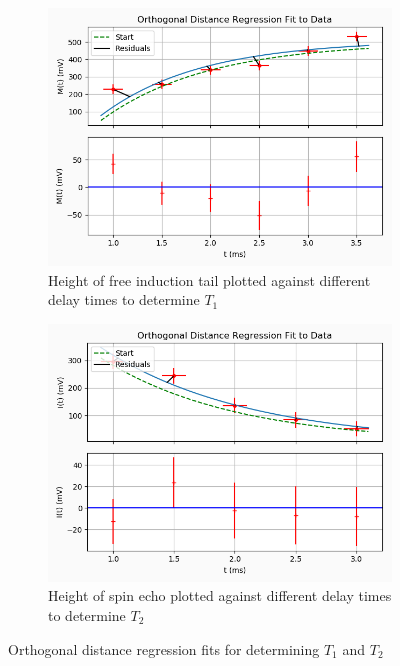 \documentclass[a4paper, 12pt]{article}  %
\begin{document}
\begin{figure}[!tbp]
  \begin{subfigure}[b]{0.5\textwidth}
    \includegraphics[width=\textwidth]{T1.png}
    \caption{Height of free induction tail plotted against different delay times to determine $T_1$}
    \label{fig:f1}
  \end{subfigure}
  \hfill
  \begin{subfigure}[b]{0.5\textwidth}
    \includegraphics[width=\textwidth]{T2.png}
    \caption{Height of spin echo plotted against different delay times to determine $T_2$}
    \label{fig:f2}
  \end{subfigure}
  \caption{Orthogonal distance regression fits for determining $T_1$ and $T_2$}
\label{ODR fits}
\end{figure}
 
\end{document}
